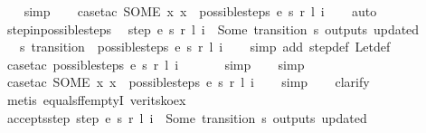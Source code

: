 \begin{isabellebody}
\ \ \isamarkupfalse%
\ simp\isanewline
\ \ \isamarkupfalse%
\ {\isacharparenleft}case{\isacharunderscore}tac\ {\isachardoublequoteopen}SOME\ x{\isachardot}\ x\ {\isacharbar}{\isasymin}{\isacharbar}\ possible{\isacharunderscore}steps\ e\ s\ r\ l\ i{\isachardoublequoteclose}{\isacharparenright}\isanewline
\ \ \isamarkupfalse%
\ auto%
\endisatagproof
{\isafoldproof}%
%
\isadelimproof
\isanewline
%
\endisadelimproof
\isanewline
{}\isamarkupfalse%
\ step{\isacharunderscore}in{\isacharunderscore}possible{\isacharunderscore}steps{\isacharcolon}\isanewline
\ \ {\isachardoublequoteopen}step\ e\ s\ r\ l\ i\ {\isacharequal}\ Some\ {\isacharparenleft}transition{\isacharcomma}\ s{\isacharprime}{\isacharcomma}\ outputs{\isacharcomma}\ updated{\isacharparenright}\ {\isasymLongrightarrow}\isanewline
\ \ \ {\isacharparenleft}s{\isacharprime}{\isacharcomma}\ transition{\isacharparenright}\ {\isacharbar}{\isasymin}{\isacharbar}\ possible{\isacharunderscore}steps\ e\ s\ r\ l\ i{\isachardoublequoteclose}\isanewline
%
\isadelimproof
\ \ %
\endisadelimproof
%
\isatagproof
{}\isamarkupfalse%
\ {\isacharparenleft}simp\ add{\isacharcolon}\ step{\isacharunderscore}def\ Let{\isacharunderscore}def{\isacharparenright}\isanewline
\ \ \isamarkupfalse%
\ {\isacharparenleft}case{\isacharunderscore}tac\ {\isachardoublequoteopen}possible{\isacharunderscore}steps\ e\ s\ r\ l\ i\ {\isacharequal}\ {\isacharbraceleft}{\isacharbar}{\isacharbar}{\isacharbraceright}{\isachardoublequoteclose}{\isacharparenright}\isanewline
\ \ \ \isamarkupfalse%
\ simp\isanewline
\ \ \isamarkupfalse%
\ simp\isanewline
\ \ \isamarkupfalse%
\ {\isacharparenleft}case{\isacharunderscore}tac\ {\isachardoublequoteopen}SOME\ x{\isachardot}\ x\ {\isacharbar}{\isasymin}{\isacharbar}\ possible{\isacharunderscore}steps\ e\ s\ r\ l\ i{\isachardoublequoteclose}{\isacharparenright}\isanewline
\ \ \isamarkupfalse%
\ simp\isanewline
\ \ \isamarkupfalse%
\ clarify\isanewline
\ \ \isamarkupfalse%
\ {\isacharparenleft}metis\ equalsffemptyI\ verit{\isacharunderscore}sko{\isacharunderscore}ex{\isacharprime}{\isacharparenright}%
\endisatagproof
{\isafoldproof}%
%
\isadelimproof
\isanewline
%
\endisadelimproof
\isanewline
{}\isamarkupfalse%
\ accepts{\isacharunderscore}step{\isacharcolon}\ {\isachardoublequoteopen}step\ e\ s\ r\ l\ i\ {\isacharequal}\ Some\ {\isacharparenleft}transition{\isacharcomma}\ s{\isacharprime}{\isacharcomma}\ outputs{\isacharcomma}\ updated{\isacharparenright}\ {\isasymLongrightarrow}\isanewline

\end{isabellebody}
